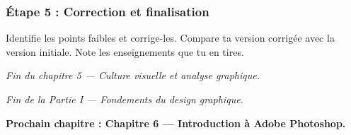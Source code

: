 \subsubsection*{Étape 5 : Correction et finalisation}

Identifie les points faibles et corrige-les. Compare ta version corrigée avec la version initiale. Note les enseignements que tu en tires.

\vspace{2em}

\begin{center}
\textit{Fin du chapitre 5 --- Culture visuelle et analyse graphique.}

\vspace{1em}

\textit{Fin de la Partie I --- Fondements du design graphique.}

\vspace{1em}

\textbf{Prochain chapitre : Chapitre 6 --- Introduction à Adobe Photoshop.}
\end{center}